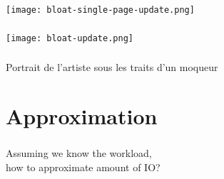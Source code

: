 \documentclass[usenames,dvipsnames, 18pt, compress, aspectratio=169]{beamer}
\begin{document}
\begin{frame}[fragile]{}
    \frametitle{}
    \begin{center}

        \texttt{[image: bloat-single-page-update.png]}

    \end{center}
\end{frame}

\begin{frame}[fragile]{}
    \frametitle{}
    \begin{center}

        \texttt{[image: bloat-update.png]}

    \end{center}
\end{frame}

\begin{frame}[fragile]{}
    \frametitle{}

    \begin{center}
     { \hspace{2.0cm} Portrait de l'artiste sous les traits d'un moqueur }
	\end{center}

\end{frame}

\section{Approximation}

\begin{frame}[fragile]{}
    \frametitle{}

    Assuming we know the workload,\\
    how to approximate amount of IO?
\end{frame}
\end{document}
